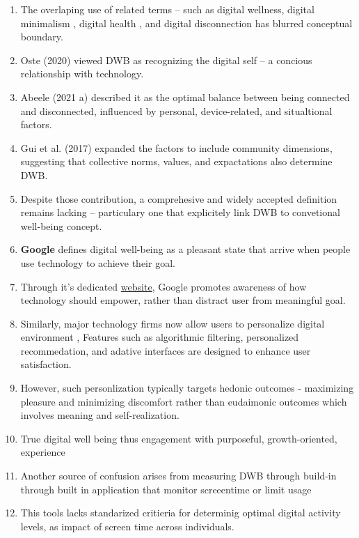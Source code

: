 \documentclass[12pt]{article}
\begin{document}
\begin{enumerate}
\begin{enumerate}
    \end{enumerate}
    \item The overlaping use of related terms -- such as digital wellness, digital minimalism \cite{dadischeck2021digital},  digital health \cite{smits2022digital}, and digital disconnection \cite{burr2020ethics} has blurred conceptual boundary.
    \item Oste (2020) viewed DWB as recognizing the digital self -- a concious relationship with technology.
    \item Abeele (2021 a) described it as the optimal balance between being connected and disconnected, influenced by personal, device-related, and situaltional factors.
    \item Gui et al. (2017) expanded the factors to include community dimensions, suggesting that collective norms, values, and expactations also determine DWB.
    \item Despite those contribution, a comprehesive and widely accepted definition remains lacking -- particulary one that  explicitely link DWB to convetional well-being concept.
    \item \textbf{Google} defines digital well-being as a pleasant state that arrive when people use technology to achieve their goal.
    \item Through it's dedicated  \href{https://wellbeing.google/}{website}, Google promotes awareness of how technology should empower, rather than distract user from meaningful goal.
    \item Similarly, major technology firms now allow users to personalize digital environment \cite{hutmacher2022personalization}, Features such as algorithmic filtering, personalized recommedation, and adative interfaces are designed to enhance user satisfaction.
    \item However, such personlization typically targets hedonic outcomes - maximizing pleasure and minimizing discomfort rather than eudaimonic outcomes which involves meaning and self-realization.
    \item True digital well being thus engagement with purposeful, growth-oriented, experience \cite{hutmacher2022personalization}
    \item Another source of confusion arises from measuring DWB through build-in through built in application that monitor screeentime or limit usage \cite{garciahermoso2020physical, przybylski2017goldilocks, twenge2019technology, whitlock2019screen} 
    \item This tools lacks standarized critieria for determinig optimal digital activity levels, as impact of screen time across individuals.

\end{enumerate}
\end{document}
